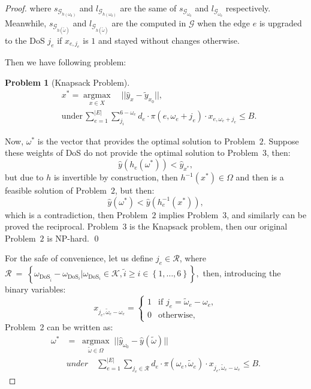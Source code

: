 \documentclass[lettersize,journal]{IEEEtran}
\newtheorem{problem}{Problem}
\begin{document}
\begin{proof}
{where $s_{\mathcal{G}_{h(\omega_{0})}}$
and $l_{\mathcal{G}_{h(\omega_{0})}}$ are the same of $s_{\mathcal{G}_{\omega_{0}}}$ and $l_{\mathcal{G}_{\omega_{0}}}$ respectively. Meanwhile, $s_{\mathcal{G}_{h(\tilde{\omega})}}$ and $l_{\mathcal{G}_{h(\tilde{\omega})}}$ are the computed in $\mathcal{G}$ when the edge $e$ is upgraded to the DoS $j_{e}$ if $x_{e, j_{e}}$ is $1$ and stayed without changes otherwise.

Then we have following problem:
\begin{problem}[Knapsack Problem]
\begin{align}
& x^{\ast} = \underset{x \in X}{\operatorname{argmax}} \quad  || \hat{y}_{x} - \tilde{y}_{x_{0}}||,\\
& \text{under} \, \sum_{e=1}^{|E|} \sum_{j_{i}}^{6-\omega_{e}} d_{e} \cdot \pi(e, \omega_{e}+j_{e}) \cdot x_{e,  \omega_{e}+j_{e}} \leq B.
\end{align}
\end{problem}
Now, $\omega^{\ast}$ is the vector that provides the optimal solution to Problem~$2$. Suppose these weights of DoS do not provide the optimal solution to Problem~$3$, then:
\begin{equation}
    \hat{y}(h_{e}(\omega^{\ast})) < \hat{y}_{x^{\ast}},
\end{equation}
but due to $h$ is invertible by construction, then $h^{-1}(x^{\ast}) \in \Omega$ and then is a feasible solution of Problem~$2$, but then:
\begin{equation}
    \hat{y}(\omega^{\ast}) < \hat{y}(h_{e}^{-1}(x^{\ast})), 
\end{equation}
which is a contradiction, then Problem~$2$ implies Problem~$3$, and similarly can be proved the reciprocal. Problem~$3$ is the Knapsack problem, then our original Problem~$2$ is NP-hard. 
    \qed
    }

For the safe of convenience, let us define $j_{e} \in \mathcal{R}$, where $\mathcal{R}~=~\left \{ \omega_{\text{DoS}_{\tilde{i}}}-\omega_{\text{DoS}_{i}} | \omega_{\text{DoS}_{i}} \in \mathcal{K}, \tilde{i} \geq i \in \left\{1, \ldots, 6  \right\} \right\},$ then, introducing the binary variables:
\begin{equation}
    x_{j_e, \tilde\omega_e - \omega_e} =
    \begin{cases}
            1 & \text{if } j_e = \tilde\omega_e - \omega_e, \\
            0 & \text{otherwise,}
    \end{cases}
\end{equation}
Problem~2 can be written as:
\begin{align}
    \omega^{\ast} &= \; \underset{\tilde{\omega} \in \Omega}{\operatorname{argmax}} \; ||\hat{y}_{\omega_{0}}- \hat{y}(\tilde{\omega}) || \\
    & \textit{under} \quad   \sum_{e=1}^{|E|} \sum_{j_{e} \in \mathcal{R}} d_{e} \cdot \pi(\omega_{e},\tilde{\omega}_{e}) \cdot x_{j_e, \tilde\omega_e - \omega_e} \leq B.
\end{align}


\end{proof}
\end{document}
